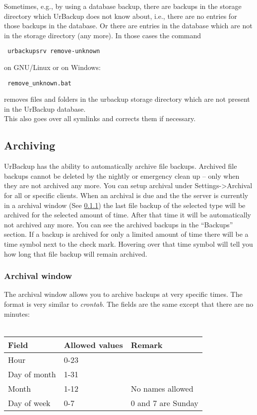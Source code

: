 \documentclass[a4paper,10pt]{article}
\begin{document}
Sometimes, e.g., by using a database backup, there are backups in the storage directory which UrBackup does not know about, i.e., there are no entries for those backups in the database. Or there are entries in the database which are not in the storage directory (any more).
In those cases the command
 \begin{verbatim}
 urbackupsrv remove-unknown
 \end{verbatim}
 on GNU/Linux or on Windows:
 \begin{verbatim}
 remove_unknown.bat
 \end{verbatim}
removes files and folders in the urbackup storage directory which are not present in the UrBackup database.\\

\noindent This also goes over all symlinks and corrects them if necessary.

\subsection{Archiving}
\label{subsec:archiving}

UrBackup has the ability to automatically archive file backups. Archived file backups
cannot be deleted by the nightly or emergency clean up -- only when they are not archived
any more. You can setup archival under Settings->Archival for all or specific clients.
When an archival is due and the the server is currently in a archival window (See \ref{subsub:archival_window})
the last file backup of the selected type will be archived for the selected amount of time.
After that time it will be automatically not archived any more. You can see the archived backups
in the ``Backups'' section. If a backup is archived for only a limited amount of time there
will be a time symbol next to the check mark. Hovering over that time symbol will tell you
how long that file backup will remain archived.

\subsubsection{Archival window}
\label{subsub:archival_window}

The archival window allows you to archive backups at very specific times. The format is
very similar to \textsl{crontab}. The fields are the same except that there are no minutes:\\
\\
\begin{tabular}{|l|l|l|}
\hline
Field & Allowed values & Remark\\
\hline \hline
Hour & 0-23 &\\
\hline
Day of month & 1-31& \\
\hline
Month & 1-12 & No names allowed \\
\hline
Day of week & 0-7 & 0 and 7 are Sunday\\
\hline
\end{tabular}\\
\end{document}

